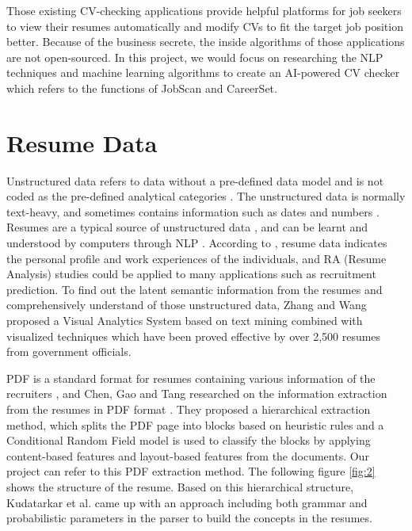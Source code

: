 Those existing CV-checking applications provide helpful platforms for job seekers to view their resumes automatically and modify CVs to fit the target job position better. Because of the business secrete, the inside algorithms of those applications are not open-sourced. In this project, we would focus on researching the NLP techniques and machine learning algorithms to create an AI-powered CV checker which refers to the functions of JobScan and CareerSet.


\section{Resume Data}

Unstructured data refers to data without a pre-defined data model \cite{gharehchopogh2011analysis} and is not coded as the pre-defined analytical categories \cite{boulton2006analysis}. The unstructured data is normally text-heavy, and sometimes contains information such as dates and numbers \cite{enwiki:1077284794}. Resumes are a typical source of unstructured data \cite{van2015difference}, and can be learnt and understood by computers through NLP \cite{hirschberg2015advances}. According to \cite{zhang2018resumevis}, resume data indicates the personal profile and work experiences of the individuals, and RA (Resume Analysis) studies could be applied to many applications such as recruitment prediction. To find out the latent semantic information from the resumes and comprehensively understand of those unstructured data, Zhang and Wang \cite{zhang2018resumevis} proposed a Visual Analytics System based on text mining combined with visualized techniques which have been proved effective by over 2,500 resumes from government officials. 

PDF is a standard format for resumes containing various information of the recruiters \cite{chen2016information}, and Chen, Gao and Tang researched on the information extraction from the resumes in PDF format \cite{chen2016information}. They proposed a hierarchical extraction method, which splits the PDF page into blocks based on heuristic rules and a Conditional Random Field model is used to classify the blocks by applying content-based features and layout-based features from the documents. Our project can refer to this PDF extraction method. The following figure \ref{fig:2} shows the structure of the resume. Based on this hierarchical structure, Kudatarkar et al.\cite{kudatarkar2015survey} came up with an approach including both grammar and probabilistic parameters in the parser to build the concepts in the resumes.

